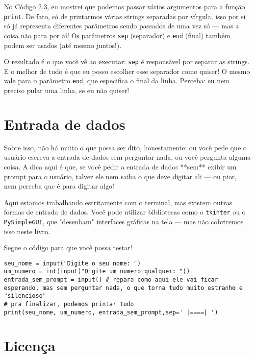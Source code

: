 \documentclass[12pt]{book}
\begin{document}
	No Código 2.3, eu mostrei que podemos passar vários argumentos para a função \texttt{print}. De fato, só de printarmos várias strings separadas por vírgula, isso por si só já representa diferentes parâmetros sendo passados de uma vez só — mas a coisa não para por aí! Os parâmetros \texttt{sep} (separador) e \texttt{end} (final) também podem ser usados (até mesmo juntos!).
	
	O resultado é o que você vê ao executar: \texttt{sep} é responsável por separar as strings. E o melhor de tudo é que eu posso escolher esse separador como quiser! O mesmo vale para o parâmetro \texttt{end}, que especifica o final da linha. Perceba: eu nem preciso pular uma linha, se eu não quiser!
	
	\section{Entrada de dados}
	
	Sobre isso, não há muito o que possa ser dito, honestamente: ou você pede que o usuário escreva a entrada de dados sem perguntar nada, ou você pergunta alguma coisa. A dica aqui é que, se você pedir a entrada de dados **sem** exibir um prompt para o usuário, talvez ele nem saiba o que deve digitar ali — ou pior, nem perceba que é para digitar algo!
	
	\begin{tcolorbox}[colback=gray!10, colframe=black, title={\large\bfseries Observação}]
		Aqui estamos trabalhando estritamente com o terminal, mas existem outras formas de entrada de dados. Você pode utilizar bibliotecas como o \texttt{tkinter} ou o \texttt{PySimpleGUI}, que "desenham" interfaces gráficas na tela — mas não cobriremos isso neste livro.
	\end{tcolorbox}
	
	Segue o código para que você possa testar!
	
	
	\begin{lstlisting}[caption={Entrada de dados}]
seu_nome = input("Digite o seu nome: ")
um_numero = int(input("Digite um numero qualquer: "))
entrada_sem_prompt = input() # repara como aqui ele vai ficar esperando, mas sem perguntar nada, o que torna tudo muito estranho e "silencioso"
# pra finalizar, podemos printar tudo
print(seu_nome, um_numero, entrada_sem_prompt,sep=' |====| ')\end{lstlisting}
	\newpage
	\section*{Licença \faCreativeCommons}
	
\end{document}

